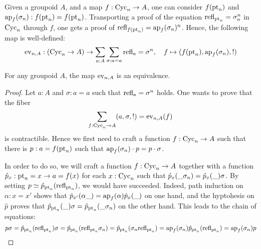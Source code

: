 Given a groupoid $A$, and a map $f :
\mathrm{Cyc}_n \to A$, one can consider $f(\mathrm{pt}_n)$ and $\ap f (\sigma_n): f(\pt_n) =
f(\pt_n)$. Transporting a proof of the equation $\mathrm{refl}_{\mathrm{pt}_n} = \sigma_n^n$ in
$\mathrm{Cyc}_n$ through $f$, one gets a proof of $\refl {f(\pt_n)} =
\ap f(\sigma_n)^n$. Hence, the following map is well-defined:
\begin{displaymath}
  \ev_{n,A} : (\Cyc_n \to A) \to \sum_{a:A}\sum_{\sigma:a=a}\refl a = \sigma^n,\quad
  f \mapsto (f(\pt_n), \ap f (\sigma_n), !)
\end{displaymath}

\begin{theorem}
  For any groupoid $A$, the map $\ev_{n,A}$ is an equivalence.
  \label{prop:ump-cycn-into-groupoids}
\end{theorem}
\begin{proof}
  Let $a:A$ and $\sigma:a=a$ such that $\mathrm{refl}_{a} = \sigma^n$ holds.
  One wants to prove that the fiber 
  \begin{displaymath}
    \sum_{f:\Cyc_n \to A} (a,\sigma, !) = \ev_{n,A}(f)
  \end{displaymath}
  is contractible. Hence we first need to craft a function $f:\mathrm{Cyc}_n \to A$
  such that there is $p:a=f(\mathrm{pt}_n)$ such that $\ap f (\sigma_n) \cdot p = p
  \cdot \sigma$.

  In order to do so, we will craft a function $f:\mathrm{Cyc}_n \to A$ together with a
  function $\hat p_x: \mathrm{pt}_n = x \to a = f(x)$ for each $x:\mathrm{Cyc}_n$ such that
  $\hat p_x(\_\sigma_n) = \hat p_x(\_) \sigma$. By setting $p \jdeq \hat
  p_{\pt_n}(\refl {\pt_n})$, we would have succeeded. Indeed, path induction on
  $\alpha: x = x'$ shows that $\hat p_{x'}(\alpha \blank) = \ap f (\alpha) \hat
  p_x(\blank)$ on one hand, and the hyptohesis on $\hat p$ proves that $\hat
  p_{\mathrm{pt}_n} (\_) \sigma = \hat p_{\mathrm{pt}_n}(\_ \sigma_n)$ on the other
  hand. This leads to the chain of equations:
  \begin{displaymath}
    p \sigma = \hat p_{\pt_n}(\refl {\pt_n}) \sigma = \hat p_{\pt_n}(\refl {\pt_n}\sigma_n) = \hat p_{\pt_n}(\sigma_n\refl {\pt_n}) = \ap f (\sigma_n) \hat p_{\pt_n}(\refl {\pt_n}) = \ap f (\sigma_n) p 
  \end{displaymath}


\end{proof}
